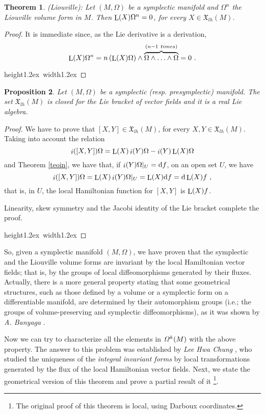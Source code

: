 \documentclass[12pt]{report}
\newtheorem{teor}{Theorem}[chapter]
\newtheorem{prop}[teor]{Proposition}
\def\dst{\displaystyle}
\def\qed{\ifvmode\removelastskip\fi
{\unskip\nobreak\hfil\penalty50\hbox{}\nobreak\hfil
\hbox{\vrule height1.2ex width1.2ex}\parfillskip=0pt
\finalhyphendemerits=0 \par\smallskip}}
\def\vf{\mathfrak X}
\def\d{{\rm d}}
\def\Lie{\mathop{\rm L}\nolimits}
\def\inn{\mathop{i}\nolimits}
\begin{document}
\begin{teor} {\rm (Liouville)}:
Let $(M,\Omega )$ be a symplectic manifold
and $\Omega^n$ the Liouville volume form in $M$.
Then $\Lie (X)\Omega^n =0$, for every $X \in \vf_{lh}(M)$.
\end{teor}
\begin{proof}
It is immediate since, as the Lie derivative is a derivation,
\vspace{-3mm}
$$
\Lie (X)\Omega^n =n\,(\Lie (X)\Omega)\wedge
\overbrace{\Omega\wedge\ldots\wedge\Omega}^{(n-1\ times)}=0 \ .
$$
\qed  \end{proof}

\begin{prop}
Let $(M,\Omega )$ be a symplectic (resp. presymplectic) manifold.
The set $\vf_{lh}(M)$ is closed for the Lie bracket of vector fields
and it is a  real Lie algebra.
\label{allie}
\end{prop}
\begin{proof}
We have to prove that $[X,Y]\in\vf_{lh}(M)$, for every $X,Y\in\vf_{lh}(M)$. 
Taking into account the relation
$$
\inn([X,Y])\Omega =
\Lie (X)\inn(Y)\Omega - \inn(Y)\Lie (X)\Omega
$$
and Theorem \ref{teoin}, we have that, if \(\dst\inn (Y)\Omega\vert_U=\d f\), on an open set $U$, we have
$$
\inn([X,Y])\Omega =\Lie (X)\inn(Y)\Omega\vert_U=\Lie(X)\d f=\d\Lie(X)f \ ,
$$
that is, in $U$, the local Hamiltonian function for $[X,Y]$ is $\Lie(X)f$.

Linearity, skew symmetry and the Jacobi identity of the Lie bracket
complete the proof.
\\ \qed  \end{proof}

So, given a symplectic manifold
$(M,\Omega )$, we have proven that the symplectic and the Liouville volume forms are invariant
by the local Hamiltonian vector fields; that is,
by the groups of local diffeomorphisms generated by their fluxes. 
Actually, there is a more general property stating that some geometrical structures,
such as those defined by a volume or a symplectic
form on a differentiable manifold,
are determined by their automorphism groups
(i.e.; the groups of volume-preserving and symplectic diffeomorphisms), as it was shown by {\it A. Banyaga} \cite{Ba86,Ba88,Ba97}.
 

Now we can try to characterize all the elements in
${\mit\Omega}^k(M)$ with the above property.
The answer to this problem was established by
{\it Lee Hwa Chung} \cite{Hw-47}, who studied the uniqueness
of  the {\sl  integral invariant forms} by local transformations generated
by the flux of  the local Hamiltonian vector fields.
Next, we state the geometrical version of this theorem and prove a partial result of it
\footnote{
The original proof of this theorem is local, using Darboux coordinates.}.
\end{document}
